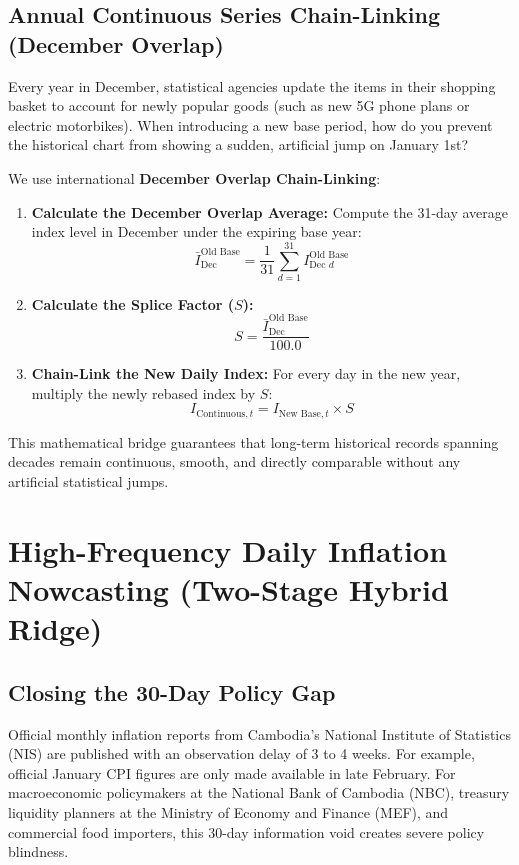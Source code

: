 \documentclass[11pt,a4paper,oneside]{article}
\begin{document}
\subsection{Annual Continuous Series Chain-Linking (December Overlap)}
Every year in December, statistical agencies update the items in their shopping basket to account for newly popular goods (such as new 5G phone plans or electric motorbikes). When introducing a new base period, how do you prevent the historical chart from showing a sudden, artificial jump on January 1st?

We use international \textbf{December Overlap Chain-Linking}:
\begin{enumerate}
    \item \textbf{Calculate the December Overlap Average:} Compute the 31-day average index level in December under the expiring base year:
    \begin{equation}
    \bar{I}_{\text{Dec}}^{\text{Old Base}} = \frac{1}{31} \sum_{d=1}^{31} I_{\text{Dec } d}^{\text{Old Base}}
    \end{equation}
    \item \textbf{Calculate the Splice Factor ($S$):}
    \begin{equation}
    S = \frac{\bar{I}_{\text{Dec}}^{\text{Old Base}}}{100.0}
    \end{equation}
    \item \textbf{Chain-Link the New Daily Index:} For every day in the new year, multiply the newly rebased index by $S$:
    \begin{equation}
    I_{\text{Continuous}, t} = I_{\text{New Base}, t} \times S
    \end{equation}
\end{enumerate}
This mathematical bridge guarantees that long-term historical records spanning decades remain continuous, smooth, and directly comparable without any artificial statistical jumps.

\newpage

\section{High-Frequency Daily Inflation Nowcasting (Two-Stage Hybrid Ridge)}

\subsection{Closing the 30-Day Policy Gap}
Official monthly inflation reports from Cambodia's National Institute of Statistics (NIS) are published with an observation delay of 3 to 4 weeks. For example, official January CPI figures are only made available in late February. For macroeconomic policymakers at the National Bank of Cambodia (NBC), treasury liquidity planners at the Ministry of Economy and Finance (MEF), and commercial food importers, this 30-day information void creates severe policy blindness.
\end{document}

